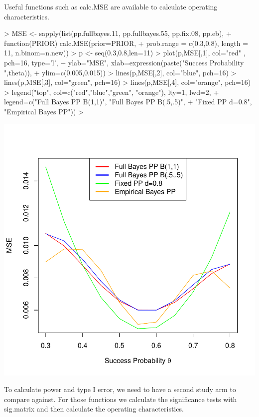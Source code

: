 \documentclass{article}
\begin{document}
Useful functions such as calc.MSE are available to calculate operating characteristics.
\begin{Schunk}
\begin{Sinput}
> MSE <- sapply(list(pp.fullbayes.11, pp.fullbayes.55, pp.fix.08, pp.eb),
+               function(PRIOR) calc.MSE(prior=PRIOR, 
+           prob.range = c(0.3,0.8), length = 11, n.binom=n.new))
> p <- seq(0.3,0.8,len=11)
> plot(p,MSE[,1],  col="red" , pch=16, type='l',
+      ylab="MSE", xlab=expression(paste("Success Probability ",theta)),
+      ylim=c(0.005,0.015))
> lines(p,MSE[,2],  col="blue", pch=16)
> lines(p,MSE[,3],  col="green", pch=16)
> lines(p,MSE[,4],  col="orange", pch=16)
> legend("top", col=c("red","blue","green", "orange"), lty=1, lwd=2,
+        legend=c("Full Bayes PP B(1,1)", "Full Bayes PP B(.5,.5)",
+                 "Fixed PP d=0.8", "Empirical Bayes PP"))
> 
\end{Sinput}
\end{Schunk}
\includegraphics{Binomial-MSE}

To calculate power and type I error, we need to have a second study arm to compare against. For those functions we calculate the significance tests with sig.matrix and then calculate the operating characteristics.
\end{document}
